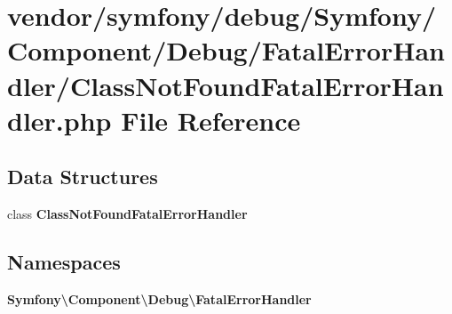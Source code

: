\section{vendor/symfony/debug/\+Symfony/\+Component/\+Debug/\+Fatal\+Error\+Handler/\+Class\+Not\+Found\+Fatal\+Error\+Handler.php File Reference}
\label{_class_not_found_fatal_error_handler_8php}
\subsection*{Data Structures}
\begin{DoxyCompactItemize}
\item 
class {\bf Class\+Not\+Found\+Fatal\+Error\+Handler}
\end{DoxyCompactItemize}
\subsection*{Namespaces}
\begin{DoxyCompactItemize}
\item 
 {\bf Symfony\textbackslash{}\+Component\textbackslash{}\+Debug\textbackslash{}\+Fatal\+Error\+Handler}
\end{DoxyCompactItemize}
